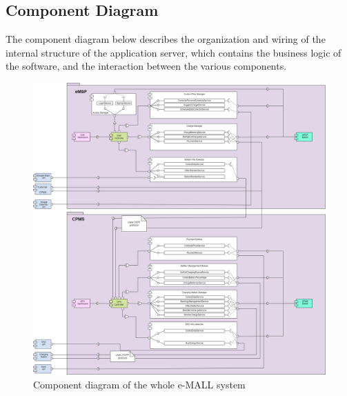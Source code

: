 \documentclass[12pt]{report}
\begin{document}
\subsection{Component Diagram}
The component diagram below describes the organization and wiring of the internal structure of the application server, which contains the business logic of the software, and the interaction between the various components.\\
 \begin{figure}[htbp]
\hspace*{-2.5cm}   
    \includegraphics[width = 1.3\textwidth]{assets/component_complete.png}
    \caption{Component diagram of the whole e-MALL system}
    \label{fig:my_label9}
\end{figure}\\
\clearpage
\end{document}
